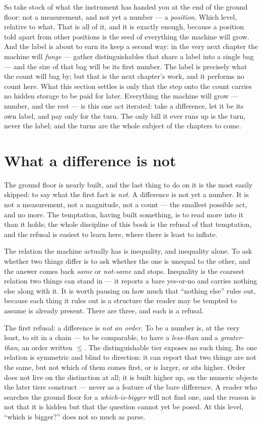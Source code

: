 So take stock of what the instrument has handed you at the end of the ground floor: not a measurement, and not yet a
number --- a \emph{position}. Which level, relative to what. That is all of it, and it is exactly enough, because a
position told apart from other positions is the seed of everything the machine will grow. And the label is about to
earn its keep a second way: in the very next chapter the machine will \emph{funge} --- gather distinguishables that
share a label into a single bag --- and the size of that bag will be its first number. The label is precisely what the
count will bag by; but that is the next chapter's work, and it performs no count here. What this section settles is
only that the step onto the count carries no hidden storage to be paid for later. Everything the machine will grow ---
number, and the rest --- is this one act iterated: take a difference, let it be its own label, and pay only for the
turn. The only bill it ever runs up is the turn, never the label; and the turns are the whole subject of the chapters
to come.

\section{What a difference is not}

The ground floor is nearly built, and the last thing to do on it is the most easily skipped: to say what the first
fact is \emph{not}. A difference is not yet a number. It is not a measurement, not a magnitude, not a count --- the
smallest possible act, and no more. The temptation, having built something, is to read more into it than it holds; the
whole discipline of this book is the refusal of that temptation, and the refusal is easiest to learn here, where there
is least to inflate.

The relation the machine actually has is inequality, and inequality alone. To ask whether two things differ is to ask
whether the one is unequal to the other, and the answer comes back \emph{same} or \emph{not-same} and stops.
Inequality is the coarsest relation two things can stand in --- it reports a bare yes-or-no and carries nothing else
along with it. It is worth pausing on how much that ``nothing else'' rules out, because each thing it rules out is a
structure the reader may be tempted to assume is already present. There are three, and each is a refusal.

The first refusal: a difference is \emph{not an order}. To be a number is, at the very least, to sit in a chain --- to
be comparable, to have a \emph{less-than} and a \emph{greater-than}, an order written \(\le\). The distinguishable
tier exposes no such thing. Its one relation is symmetric and blind to direction: it can report that two things are
not the same, but not which of them comes first, or is larger, or sits higher. Order does not live on the distinction
at all; it is built higher up, on the numeric objects the later tiers construct --- never as a feature of the bare
difference. A reader who searches the ground floor for a \emph{which-is-bigger} will not find one, and the reason is
not that it is hidden but that the question cannot yet be posed. At this level, ``which is bigger?'' does not so much
as parse.

